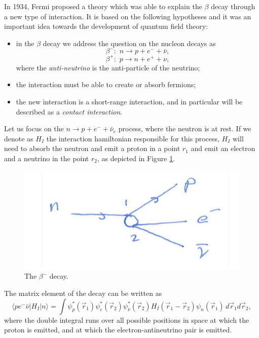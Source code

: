 In 1934, Fermi proposed a theory which was able to explain the $\beta$ decay through a new type of interaction. It is based on the following hypotheses and it was an important idea towards the development of  quantum field theory:
\begin{itemize}
    \item in the $\beta$ decay we address the question on the nucleon decays as
    \begin{equation*}
        \beta^- :\,\,n\rightarrow p + e^- + \bar{\nu},
    \end{equation*}
    \begin{equation*}
        \beta^+ :\,\,p\rightarrow n + e^+ + \nu,
    \end{equation*}
    where the  \textit{anti-neutrino} is the anti-particle of the neutrino;
    \item the interaction must be able to create or absorb fermions;
    \item the new interaction is a short-range interaction, and in particular will be described as a \emph{contact interaction}.
\end{itemize}

Let us focus on the \(n\to p + e^- + \bar{\nu}_e\) process, where the neutron is at rest.
If we denote as $H_I$ the interaction hamiltonian responsible for this process, $H_I$ will need to absorb the neutron and emit a proton in a point $r_1$ and emit an electron and a neutrino in the point $r_2$, as depicted in Figure \ref{nuclear-physics-fig:19}. 
\begin{figure}[h]
    \centering
    \includegraphics[scale=0.2]{Figures/nuclear-physics-fig19}
    \caption{The $\beta^{-}$ decay.}
    \label{nuclear-physics-fig:19}
\end{figure}
The matrix element of the decay can be written as
\begin{equation*}
    \langle pe^-\bar{\nu} | H_I | n \rangle = \int \psi_p^*(\Vec{r}_1)\psi_e^*(\Vec{r}_2)\psi_{\bar{\nu}}^*(\Vec{r}_2) H_I(\Vec{r}_1-\Vec{r}_2) \psi_n(\Vec{r}_1)\,d\Vec{r}_1d\Vec{r}_2,
\end{equation*}
where the double integral runs over all possible positions in space at which the proton is emitted, and at which the electron-antineutrino pair is emitted.


